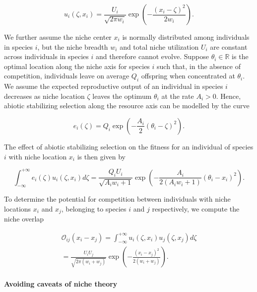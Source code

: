 \documentclass[]{elsarticle} %
\begin{document}
\begin{equation}
u_i(\zeta,x_i)=\frac{U_i}{\sqrt{2\pi w_i}}\exp\left(-\frac{(x_i-\zeta)^2}{2w_i}\right).
\end{equation}

We further assume the niche center \(x_i\) is normally distributed among
individuals in species \(i\), but the niche breadth \(w_i\) and total
niche utilization \(U_i\) are constant across individuals in species
\(i\) and therefore cannot evolve. Suppose \(\theta_i\in\mathbb R\) is
the optimal location along the niche axis for species \(i\) such that,
in the absence of competition, individuals leave on average \(Q_i\)
offspring when concentrated at \(\theta_i\). We assume the expected
reproductive output of an individual in species \(i\) decreases as niche
location \(\zeta\) leaves the optimum \(\theta_i\) at the rate
\(A_i>0\). Hence, abiotic stabilizing selection along the resource axis
can be modelled by the curve

\begin{equation}
e_i(\zeta)=Q_i\exp\left(-\frac{A_i}{2}(\theta_i-\zeta)^2\right).
\end{equation}

The effect of abiotic stabilizing selection on the fitness for an
individual of species \(i\) with niche location \(x_i\) is then given by

\begin{equation}
\int_{-\infty}^{+\infty}e_i(\zeta)u_i(\zeta,x_i)d\zeta=\frac{Q_iU_i}{\sqrt{A_iw_i+1}}\exp\left(-\frac{A_i}{2(A_iw_i+1)}(\theta_i-x_i)^2\right).
\end{equation}

To determine the potential for competition between individuals with
niche locations \(x_i\) and \(x_j\), belonging to species \(i\) and
\(j\) respectively, we compute the niche overlap

\begin{multline}
\mathcal O_{ij}(x_i-x_j)=\int_{-\infty}^{+\infty}u_i(\zeta,x_i)u_j(\zeta,x_j)d\zeta\\=\frac{U_iU_j}{\sqrt{2\pi(w_i+w_j)}}\exp\left(-\frac{(x_i-x_j)^2}{2(w_i+w_j)}\right).
\end{multline}

\paragraph{Avoiding caveats of niche theory}
\end{document}
